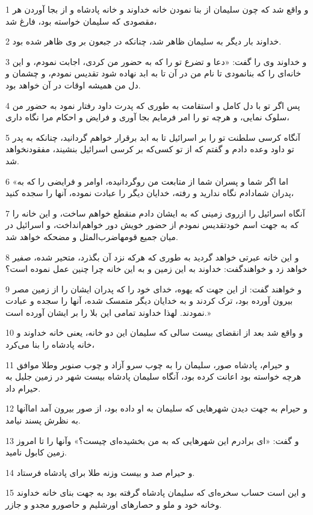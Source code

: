 \par 1 و واقع شد که چون سلیمان از بنا نمودن خانه خداوند و خانه پادشاه و از بجا آوردن هر مقصودی که سلیمان خواسته بود، فارغ شد،
\par 2 خداوند بار دیگر به سلیمان ظاهر شد، چنانکه در جبعون بر وی ظاهر شده بود.
\par 3 و خداوند وی را گفت: «دعا و تضرع تو را که به حضور من کردی، اجابت نمودم، و این خانه‌ای را که بنانمودی تا نام من در آن تا به ابد نهاده شود تقدیس نمودم، و چشمان و دل من همیشه اوقات در آن خواهد بود.
\par 4 پس اگر تو با دل کامل و استقامت به طوری که پدرت داود رفتار نمود به حضور من سلوک نمایی، و هر‌چه تو را امر فرمایم بجا آوری و فرایض و احکام مرا نگاه داری،
\par 5 آنگاه کرسی سلطنت تو را بر اسرائیل تا به ابد برقرار خواهم گردانید، چنانکه به پدر تو داود وعده دادم و گفتم که از تو کسی‌که بر کرسی اسرائیل بنشیند، مفقودنخواهد شد.
\par 6 «اما اگر شما و پسران شما از متابعت من روگردانیده، اوامر و فرایضی را که به پدران شمادادم نگاه ندارید و رفته، خدایان دیگر را عبادت نموده، آنها را سجده کنید،
\par 7 آنگاه اسرائیل را ازروی زمینی که به ایشان دادم منقطع خواهم ساخت، و این خانه را که به جهت اسم خودتقدیس نمودم از حضور خویش دور خواهم‌انداخت، و اسرائیل در میان جمیع قومهاضرب‌المثل و مضحکه خواهد شد.
\par 8 و این خانه عبرتی خواهد گردید به طوری که هر‌که نزد آن بگذرد، متحیر شده، صفیر خواهد زد و خواهندگفت: خداوند به این زمین و به این خانه چرا چنین عمل نموده است؟
\par 9 و خواهند گفت: از این جهت که یهوه، خدای خود را که پدران ایشان را از زمین مصر بیرون آورده بود، ترک کردند و به خدایان دیگر متمسک شده، آنها را سجده و عبادت نمودند. لهذا خداوند تمامی این بلا را بر ایشان آورده است.»
\par 10 و واقع شد بعد از انقضای بیست سالی که سلیمان این دو خانه، یعنی خانه خداوند و خانه پادشاه را بنا می‌کرد،
\par 11 و حیرام، پادشاه صور، سلیمان را به چوب سرو آزاد و چوب صنوبر وطلا موافق هر‌چه خواسته بود اعانت کرده بود، آنگاه سلیمان پادشاه بیست شهر در زمین جلیل به حیرام داد.
\par 12 و حیرام به جهت دیدن شهرهایی که سلیمان به او داده بود، از صور بیرون آمد اماآنها به نظرش پسند نیامد.
\par 13 و گفت: «ای برادرم این شهرهایی که به من بخشیده‌ای چیست؟» وآنها را تا امروز زمین کابول نامید.
\par 14 و حیرام صد و بیست وزنه طلا برای پادشاه فرستاد.
\par 15 و این است حساب سخره‌ای که سلیمان پادشاه گرفته بود به جهت بنای خانه خداوند وخانه خود و ملو و حصارهای اورشلیم و حاصورو مجدو و جازر.

